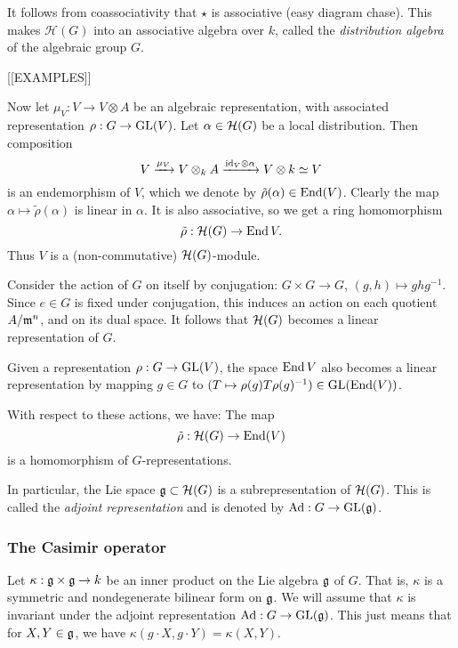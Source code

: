 \documentclass[11pt, english]{article}
\begin{document}
It follows from coassociativity that $\star$ is associative (easy diagram chase). This makes $\mathcal H(G)$ into an associative algebra over $k$, called the \emph{distribution algebra} of the algebraic group $G$. 

[[EXAMPLES]]

Now let $\mu_V: V \to V \otimes A$ be an algebraic representation, with associated representation $\rho:G \to \operatorname{GL}(V)$. Let $\alpha \in \mathcal{H}(G)$ be a local distribution. Then composition
\[
V \xrightarrow{\mu_V} V \otimes_k A \xrightarrow{\text{id}_V \otimes \alpha} V \otimes k \simeq V
\]
is an endemorphism of $V$, which we denote by $\tilde \rho(\alpha)\in \operatorname{End}(V)$. Clearly the map $\alpha \mapsto \tilde \rho (\alpha)$ is linear in $\alpha$. It is also associative, so we get a ring homomorphism
\begin{equation}
\tilde \rho: \mathcal{H}(G) \to \operatorname{End} V.
\end{equation}
Thus $V$ is a (non-commutative) $\mathcal{H}(G)$-module.

Consider the action of $G$ on itself by conjugation: $G \times G \to G$, $(g,h) \mapsto  ghg^{-1}$. Since $e \in G$ is fixed under conjugation, this induces an action on each quotient $A/\mathfrak{m}^n$, and on its dual space. It follows that $\mathcal{H}(G)$ becomes a linear representation of $G$.

Given a representation $\rho:G \to \operatorname{GL}(V)$, the space $\operatorname{End} V$ also becomes a linear representation by mapping $g \in G$ to $(T \mapsto \rho(g) T \rho(g)^{-1}) \in \operatorname{GL}(\operatorname{End}(V))$. 

\begin{lemma}
With respect to these actions, we have: The map
$$
\tilde \rho : \mathcal{H}(G) \to \operatorname{End}(V)
$$
is a homomorphism of $G$-representations.
\end{lemma}

In particular, the Lie space $\mathfrak g \subset \mathcal{H}(G)$ is a subrepresentation of $\mathcal{H}(G)$. This is called the \emph{adjoint representation} and is denoted by $\mathrm{Ad}:G \to \operatorname{GL}(\mathfrak g)$.


\subsubsection{The Casimir operator}

Let $\kappa: \mathfrak g \times \mathfrak g \to k$ be an inner product on the Lie algebra $\mathfrak g$ of $G$. That is, $\kappa$ is a symmetric and nondegenerate bilinear form on $\mathfrak g$. We will assume that $\kappa$ is invariant under the adjoint representation $\mathrm{Ad}: G \to \operatorname{GL}(\mathfrak g)$. This just means that for $X,Y \in \mathfrak g$, we have $\kappa(g \cdot X,g \cdot Y)=\kappa(X,Y)$. 
\end{document}

